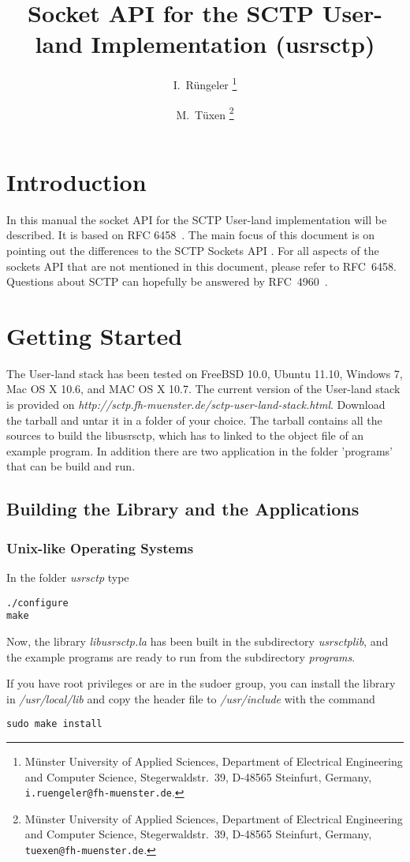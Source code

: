 \documentclass[a4paper]{article}
\title{Socket API for the SCTP User-land Implementation (usrsctp)}
\author{I.~R\"ungeler%
        \thanks{M\"unster University of Applied Sciences,
                Department of Electrical Engineering
                and Computer Science,
                Stegerwaldstr.~39,
                D-48565 Steinfurt,
                Germany,
                \texttt{i.ruengeler@fh-muenster.de}.}
        \and
        M.~T\"uxen%
        \thanks{M\"unster University of Applied Sciences,
                Department of Electrical Engineering
                and Computer Science,
                Stegerwaldstr.~39,
                D-48565 Steinfurt,
                Germany,
                \texttt{tuexen@fh-muenster.de}.}
}
\begin{document}
\setcounter{secnumdepth}{4}
\setcounter{tocdepth}{4}
\maketitle
\tableofcontents

\section{Introduction}
In this manual the socket API for the SCTP User-land implementation will be described. 
It is based on RFC 6458~\cite{socketAPI}. The main focus of this document is on pointing out
 the differences to the SCTP Sockets API . For all aspects of the sockets API that are not
 mentioned in this document, please refer to RFC~6458. Questions about SCTP can hopefully be
 answered by RFC~4960~\cite{SCTP}.
 
\section{Getting Started}
The User-land stack has been tested on FreeBSD 10.0, Ubuntu 11.10, Windows 7, Mac OS X 10.6, 
and MAC OS X 10.7.
The current version of the User-land stack is provided on \textit{http://sctp.fh-muenster.de/sctp-user-land-stack.html}.
Download the tarball and untar it in a folder of your choice. 
The tarball contains all the sources to build the libusrsctp, which has to linked to the object file of an 
example program. In addition there are two application in the folder 'programs'  that can be build and run.
 
\subsection{Building the Library and the Applications}
\subsubsection{Unix-like Operating Systems}
In the folder \textit{usrsctp} type
\begin{verbatim}
./configure
make
\end{verbatim}
Now, the library \textit{libusrsctp.la} has been built in the subdirectory \textit{usrsctplib}, and the example 
programs are ready to run from the subdirectory \textit{programs}.

If you have root privileges or are in the sudoer group, you can install the library in \textit{/usr/local/lib} 
and copy the header file to \textit{/usr/include} with the command
\begin{verbatim}
sudo make install
\end{verbatim}
\end{document}
